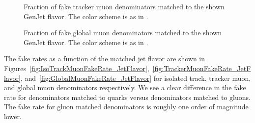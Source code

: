\documentclass{cmspaper}
\begin{document}
\begin{figure}[htb]
\begin{center}
    \caption{Fraction of fake tracker muon denominators matched to the shown GenJet flavor. The color scheme is as in .}
   \label{fig:TrackerMuonDenominator_JetFlavor}
\end{center}
\end{figure}

\begin{figure}[htb]
\begin{center}
   \caption{Fraction of fake global muon denominators matched to the shown GenJet flavor. The color scheme is as in .}
   \label{fig:GlobalMuonDenominator_JetFlavor}
\end{center}
\end{figure}

The fake rates as a function of the matched jet flavor are shown in Figures~\ref{fig:IsoTrackMuonFakeRate_JetFlavor},~\ref{fig:TrackerMuonFakeRate_JetFlavor}, and~\ref{fig:GlobalMuonFakeRate_JetFlavor} for isolated track, tracker muon, and global muon denominators respectively. We see a clear difference in the fake rate for denominators matched to quarks versus denominators matched to gluons. The fake rate for gluon matched denominators is roughly one order of magnitude lower. 
\end{document}
